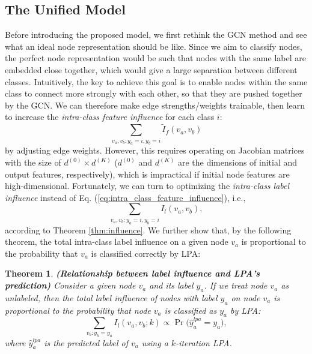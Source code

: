 \documentclass{article}
\newtheorem{theorem}{Theorem}
\begin{document}
	\subsection{The Unified Model}
	\label{sec:model}
		Before introducing the proposed model, we first rethink the GCN method and see what an ideal node representation should be like.
		Since we aim to classify nodes, the perfect node representation would be such that nodes with the same label are embedded close together, which would give a large separation between different classes.
Intuitively, the key to achieve this goal is to enable nodes within the same class to connect more strongly with each other, so that they are pushed together by the GCN.
		We can therefore make edge strengths/weights trainable, then learn to increase the \textit{intra-class feature influence} for each class $i$:
		\begin{equation}
			\label{eq:intra_class_feature_influence}
			\sum_{v_a, v_b: y_a = i, y_b = i} \tilde I_f(v_a, v_b)
		\end{equation}
		by adjusting edge weights.
		However, this requires operating on Jacobian matrices with the size of $d^{(0)} \times d^{(K)}$ ($d^{(0)}$ and $d^{(K)}$ are the dimensions of initial and output features, respectively), which is impractical if initial node features are high-dimensional.
		Fortunately, we can turn to optimizing the \textit{intra-class label influence} instead of Eq. (\ref{eq:intra_class_feature_influence}), i.e.,
		\begin{equation}
			\label{eq:intra_class_label_influence}
			\sum_{v_a, v_b: y_a = i, y_b = i} I_l(v_a, v_b),
		\end{equation}
		according to Theorem \ref{thm:influence}.
		We further show that, by the following theorem, the total intra-class label influence on a given node $v_a$ is proportional to the probability that $v_a$ is classified correctly by LPA:
		\begin{theorem}
		\label{thm:lpa}
			\rm\textbf{(Relationship between label influence and LPA's prediction)}
			Consider a given node $v_a$ and its label $y_a$.
			If we treat node $v_a$ as unlabeled, then the total label influence of nodes with label $y_a$ on node $v_a$ is proportional to the probability that node $v_a$ is classified as $y_a$ by LPA:
			\begin{equation}
				\sum_{v_b: y_b = y_a} I_l(v_a, v_b; k) \propto \Pr \big( \hat y_a^{lpa} = y_a \big),
			\end{equation}
			where $\hat y_a^{lpa}$ is the predicted label of $v_a$ using a $k$-iteration LPA.
		\end{theorem}
		
\end{document}
